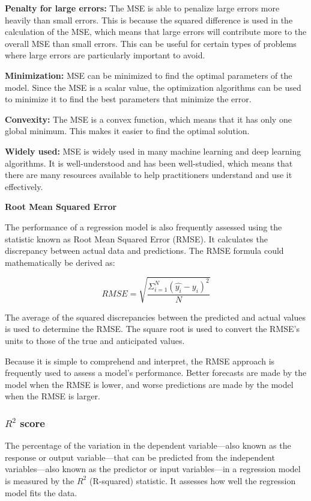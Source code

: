 \documentclass[a4paper]{article}
\begin{document}
\textbf{Penalty for large errors:} The MSE is able to penalize large errors more heavily than small errors. This is because the squared difference is used in the calculation of the MSE, which means that large errors will contribute more to the overall MSE than small errors. This can be useful for certain types of problems where large errors are particularly important to avoid.

\textbf{Minimization: }MSE can be minimized to find the optimal parameters of the model. Since the MSE is a scalar value, the optimization algorithms can be used to minimize it to find the best parameters that minimize the error.

\textbf{Convexity:} The MSE is a convex function, which means that it has only one global minimum. This makes it easier to find the optimal solution.

\textbf{Widely used:} MSE is widely used in many machine learning and deep learning algorithms. It is well-understood and has been well-studied, which means that there are many resources available to help practitioners understand and use it effectively.

\textbf{Root Mean Squared Error}

The performance of a regression model is also frequently assessed using the statistic known as Root Mean Squared Error (RMSE). It calculates the discrepancy between actual data and predictions. The RMSE formula could mathematically be derived as:

$$
RMSE = \sqrt{\frac{\Sigma_{i=1}^{N}(\hat{y_{i}}-y_{i})^2}{N}}
$$

The average of the squared discrepancies between the predicted and actual values is used to determine the RMSE. The square root is used to convert the RMSE's units to those of the true and anticipated values.

Because it is simple to comprehend and interpret, the RMSE approach is frequently used to assess a model's performance. Better forecasts are made by the model when the RMSE is lower, and worse predictions are made by the model when the RMSE is larger. 
\subsubsection{$R^2$ score}
The percentage of the variation in the dependent variable—also known as the response or output variable—that can be predicted from the independent variables—also known as the predictor or input variables—in a regression model is measured by the $R^2$ (R-squared) statistic. It assesses how well the regression model fits the data.
\end{document}
